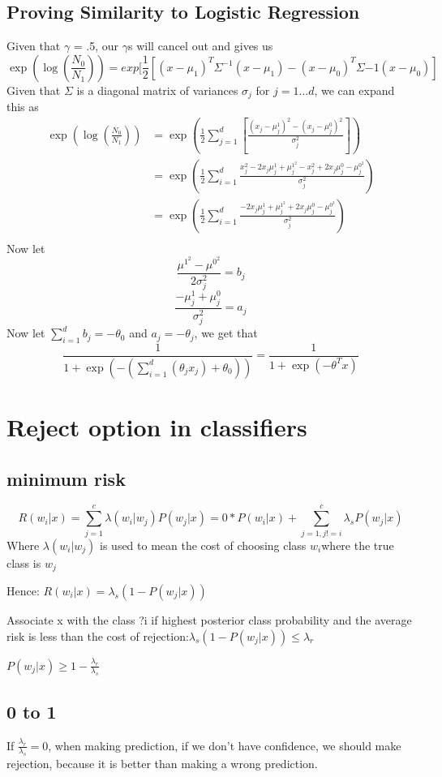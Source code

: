 \documentclass[pdftex,11pt]{article}
\begin{document}
\subsection{Proving Similarity to Logistic Regression}
Given that $\gamma$ = .5, our $\gamma$s will cancel out and gives us
$$\exp(\log(\frac{N_0}{N_1})) = exp[\frac{1}{2}[(x-\mu_1)^T\Sigma^{-1}(x-\mu_1)-(x-\mu_0)^T\Sigma{-1}(x-\mu_0)]$$
Given that $\Sigma$ is a diagonal matrix of variances $\sigma_j$ for $j = 1...d$, we can expand this as
\begin{align*}
\exp(\log(\frac{N_0}{N_1})) &= \exp(\frac{1}{2}\sum_{j=1}^d[\frac{(x_j-\mu_j^1)^2 - (x_j-\mu_j^0)^2}{\sigma_j^2}])\\
&=\exp(\frac{1}{2}\sum_{i=1}^d\frac{x_j^2 - 2x_j\mu_j^1 + \mu_j^{1^2} - x_j^2 + 2x_j\mu_j^0-\mu_j^{0^2}}{\sigma_j^2})\\
&=\exp(\frac{1}{2}\sum_{i=1}^d\frac{-2x_j\mu^1_j +\mu_j^{1^2}+2x_j\mu_j^0-\mu_j^{0^2}}{\sigma_j^2})\\
\end{align*}
Now let 
$$\frac{\mu^{1^2} - \mu^{0^2}}{2\sigma_j^2} = b_j$$
$$\frac{-\mu_j^1 + \mu_j^0}{\sigma_j^2} = a_j$$
Now let $\sum_{i=1}^d b_j = -\theta_0$ and $a_j = -\theta_j$, we get that
$$\frac{1}{1 + \exp(-(\sum^d_{i=1}(\theta_j x_j) +\theta_0))} = \frac{1}{1+\exp(-\theta^T x)}$$
\section{Reject option in classifiers}
\subsection{minimum risk}
\begin{equation}
R(w_{i}|x)=\sum_{j=1}^{c}\lambda(w_{i}|w_{j})P(w_{j}|x)=0*P(w_{i}|x)+\sum_{j=1,j!=i}^{c}\lambda_{s}P(w_{j}|x)
\end{equation}
Where $\lambda(w_{i}|w_{j})$ is used to mean the cost of choosing class $w_{i}$where the true class is $w_{j}$

Hence:
$R(w_{i}|x)=\lambda_{s}(1-P(w_{j}|x))$

Associate x with the class ?i if highest posterior class probability and the average risk is less than the cost of rejection:$\lambda_{s}(1-P(w_{j}|x))\leq\lambda_{r}$

$P(w_{j}|x)\geq1-\frac{\lambda_{r}}{\lambda_{s}}$

\subsection{0 to 1} 
If $\frac{\lambda_{r}}{\lambda_{s}}=0$, when making prediction, if we don't have confidence, we should make rejection, because it is better than making a wrong prediction.
\end{document}

